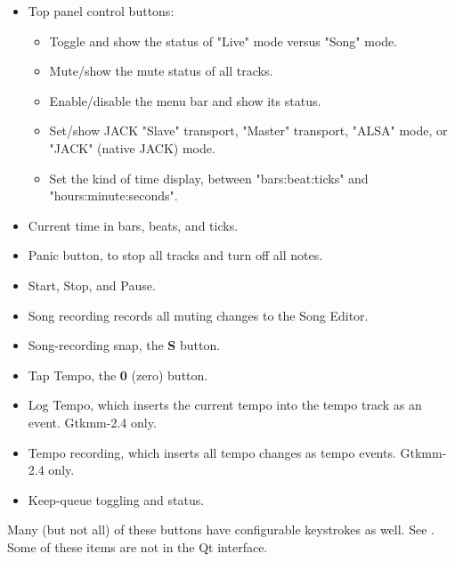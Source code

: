 \documentclass[
 11pt,
 twoside,
 a4paper,
 headinclude,
 footinclude,
 final                                 %
]{article}
\begin{document}
   \begin{itemize}
      \item Top panel control buttons:
      \begin{itemize}
         \item Toggle and show the status of "Live" mode versus "Song" mode.
         \item Mute/show the mute status of all tracks.
         \item Enable/disable the menu bar and show its status.
         \item Set/show JACK "Slave" transport, "Master" transport,
            "ALSA" mode, or "JACK" (native JACK) mode.
         \item Set the kind of time display, between "bars:beat:ticks"
            and "hours:minute:seconds".
      \end{itemize}
      \item Current time in bars, beats, and ticks.
      \item Panic button, to stop all tracks and turn off all notes.
      \item Start, Stop, and Pause.
      \item Song recording records all muting changes to the Song Editor.
      \item Song-recording snap, the \textbf{S} button.
      \item Tap Tempo, the \textbf{0} (zero) button.
      \item Log Tempo, which inserts the current tempo into the tempo track
         as an event. Gtkmm-2.4 only.
      \item Tempo recording, which inserts all tempo changes as tempo events.
         Gtkmm-2.4 only.
      \item Keep-queue toggling and status.
   \end{itemize}

   Many (but not all) of these buttons have configurable keystrokes as well.
   See .
   Some of these items are not in the Qt interface.

%

\end{document}

